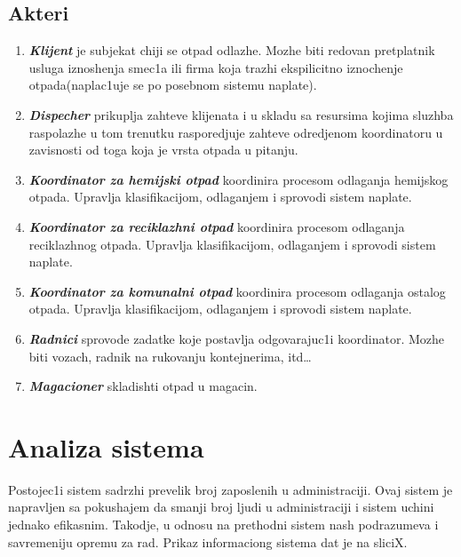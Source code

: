 \documentclass[10 pt]{article}
\begin{document}
\subsection{Akteri}
	\begin{enumerate}
		\item
			\textit{\textbf{Klijent}} je subjekat chiji se otpad odlazhe. Mozhe biti redovan pretplatnik usluga iznoshenja smec1a ili firma koja trazhi ekspilicitno iznochenje otpada(naplac1uje se po posebnom sistemu naplate).
		\item 
			\textit{\textbf{Dispecher}} prikuplja zahteve klijenata i u skladu sa resursima kojima sluzhba raspolazhe u tom trenutku rasporedjuje zahteve odredjenom koordinatoru u zavisnosti od toga koja je vrsta otpada u pitanju.
		\item 
			\textit{\textbf{Koordinator za hemijski otpad}} koordinira procesom odlaganja hemijskog otpada. Upravlja klasifikacijom, odlaganjem i sprovodi sistem naplate.
		\item 
			\textit{\textbf{Koordinator za reciklazhni otpad}} koordinira procesom odlaganja reciklazhnog otpada. Upravlja klasifikacijom, odlaganjem i sprovodi sistem naplate.
		\item 
			\textit{\textbf{Koordinator za komunalni otpad}} koordinira procesom odlaganja ostalog otpada. Upravlja klasifikacijom, odlaganjem i sprovodi sistem naplate. 	
		\item 
			\textit{\textbf{Radnici}} sprovode zadatke koje postavlja odgovarajuc1i koordinator. Mozhe biti vozach, radnik na rukovanju kontejnerima, itd…
		\item 
			\textit{\textbf{Magacioner}} skladishti otpad u magacin. 
	\end{enumerate}


\section{Analiza sistema}
\setlength{\parindent}{30pt} Postojec1i sistem sadrzhi prevelik broj zaposlenih u administraciji. Ovaj sistem je napravljen sa pokushajem da smanji broj ljudi u administraciji i sistem uchini jednako efikasnim. Takodje, u odnosu na prethodni sistem nash podrazumeva i savremeniju opremu za rad. Prikaz informaciong sistema dat je na sliciX. 
\end{document}
